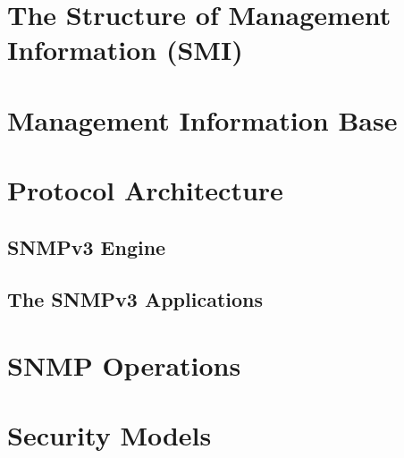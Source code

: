 \section{The Structure of Management Information (SMI)}

\section{Management Information Base}

\section{Protocol Architecture}

\subsection{SNMPv3 Engine}

\subsection{The SNMPv3 Applications}

\section{SNMP Operations}

\section{Security Models}

